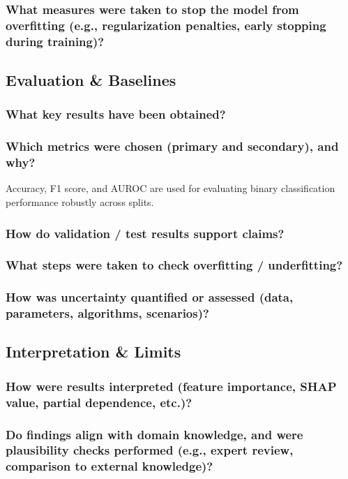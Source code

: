 \documentclass[sigconf]{acmart}
\begin{document}
\subsubsection{What measures were taken to stop the model from overfitting (e.g., regularization penalties, early stopping during training)?}

\subsection{Evaluation \& Baselines}
\subsubsection{What key results have been obtained?}
\subsubsection{Which metrics were chosen (primary and secondary), and why?} Accuracy, F1 score, and AUROC are used for evaluating binary classification performance robustly across splits.
\subsubsection{How do validation / test results support claims?}
\subsubsection{What steps were taken to check overfitting / underfitting?}
\subsubsection{How was uncertainty quantified or assessed (data, parameters, algorithms, scenarios)?}

\subsection{Interpretation \& Limits}
\subsubsection{How were results interpreted (feature importance, SHAP value, partial dependence, etc.)?}
\subsubsection{Do findings align with domain knowledge, and were plausibility checks performed (e.g., expert review, comparison to external knowledge)?}
\end{document}
